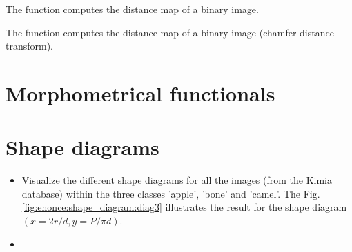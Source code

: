 \vspace*{-8pt}

\begin{mcomment}
\begin{mremark}
The function  computes the distance map of a binary image.
\end{mremark}
\end{mcomment}

\begin{pcomment}
\begin{premark}
The function  computes the distance map of a binary image (chamfer distance transform).
\end{premark}
\end{pcomment}

\vspace*{-18pt}
\section{Morphometrical functionals}\vspace*{-10pt}
\begin{qbox} 
\end{qbox}

\vspace*{-10pt}

\section{Shape diagrams}\vspace*{-10pt}
\begin{qbox}
\begin{itemize}
	\item Visualize the different shape diagrams for all the images (from the Kimia database) within the three classes 'apple', 'bone' and 'camel'. The Fig.\ref{fig:enonce:shape_diagram:diag3} illustrates the result for the shape diagram $(x=2r/d, y=P/\pi d)$.

	\item {}
\end{itemize}
\end{qbox}

